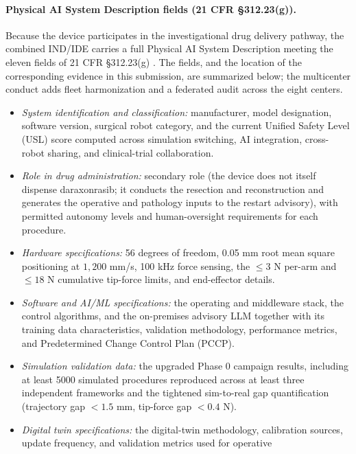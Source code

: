 \paragraph{Physical AI System Description fields (21 CFR \S312.23(g)).}
Because the device participates in the investigational drug delivery pathway, the
combined IND/IDE carries a full Physical AI System Description meeting the eleven
fields of 21 CFR \S312.23(g) \cite{kawchak2026adapt312}. The fields, and the
location of the corresponding evidence in this submission, are summarized below;
the multicenter conduct adds fleet harmonization and a federated audit across the
eight centers.

\begin{itemize}[leftmargin=1.4em,itemsep=1pt,topsep=2pt]
\item[(i)] \textit{System identification and classification:} manufacturer, model
designation, software version, surgical robot category, and the current Unified
Safety Level (USL) score computed across simulation switching, AI integration,
cross-robot sharing, and clinical-trial collaboration.
\item[(ii)] \textit{Role in drug administration:} secondary role (the device does
not itself dispense daraxonrasib; it conducts the resection and reconstruction and
generates the operative and pathology inputs to the restart advisory), with
permitted autonomy levels and human-oversight requirements for each procedure.
\item[(iii)] \textit{Hardware specifications:} 56 degrees of freedom, 0.05 mm root
mean square positioning at $1{,}200$ mm/s, 100 kHz force sensing, the $\leq 3$ N
per-arm and $\leq 18$ N cumulative tip-force limits, and end-effector details.
\item[(iv)] \textit{Software and AI/ML specifications:} the operating and
middleware stack, the control algorithms, and the on-premises advisory LLM together
with its training data characteristics, validation methodology, performance
metrics, and Predetermined Change Control Plan (PCCP).
\item[(v)] \textit{Simulation validation data:} the upgraded Phase 0 campaign
results, including at least 5000 simulated procedures reproduced across at least
three independent frameworks and the tightened sim-to-real gap quantification
(trajectory gap $< 1.5$ mm, tip-force gap $< 0.4$ N).
\item[(vi)] \textit{Digital twin specifications:} the digital-twin methodology,
calibration sources, update frequency, and validation metrics used for operative

\end{itemize}
